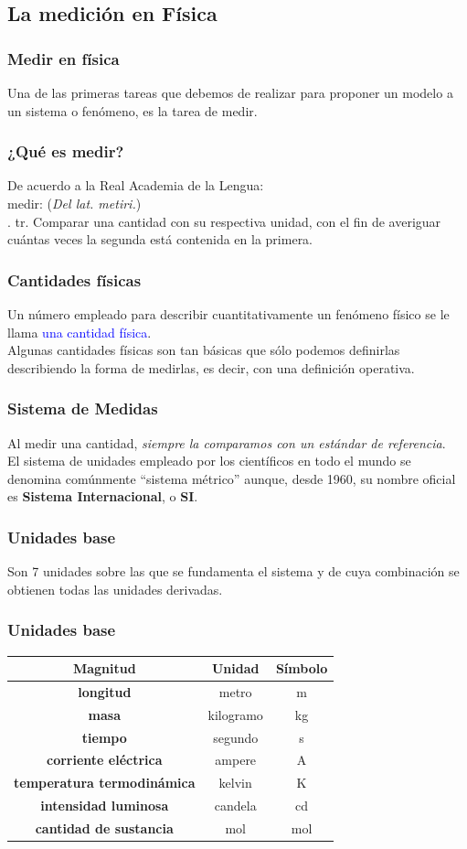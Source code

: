 \subsection{La medición en Física}
\begin{frame}
\frametitle{Medir en física}
Una de las primeras tareas que debemos de realizar para proponer un modelo a un sistema o fenómeno, es la tarea de medir.
\end{frame}
\begin{frame}
\frametitle{¿Qué es medir?}
De acuerdo a la Real Academia de la Lengua:
\\
\bigskip
\pause
medir:
(\textit{Del lat. metiri.})
\\
. tr. Comparar una cantidad con su respectiva unidad, con el fin de averiguar cuántas veces la segunda está contenida en la primera.
\end{frame}
\begin{frame}
\frametitle{Cantidades físicas}
Un número empleado para describir cuantitativamente un fenómeno físico se le llama \textcolor{blue}{una cantidad física}.
\\
\bigskip
\pause
Algunas cantidades físicas son tan básicas que sólo podemos definirlas describiendo la forma de medirlas, es decir, con una definición operativa.
\end{frame}
\begin{frame}
\frametitle{Sistema de Medidas}
Al medir una cantidad, \emph{siempre la comparamos con un estándar de referencia}.
\\
\bigskip
\pause
El sistema de unidades empleado por los científicos en todo el mundo se denomina comúnmente \enquote{sistema métrico} aunque, desde 1960, su nombre oficial es \textbf{Sistema Internacional}, o \textbf{SI}.
\end{frame}
\begin{frame}
\frametitle{Unidades base}
Son 7 unidades sobre las que se fundamenta el sistema y de cuya combinación se obtienen todas las unidades derivadas.
\end{frame}
\begin{frame}[plain]
\frametitle{Unidades base}
\begin{tabular}{ | c | c | c |}
\hline
Magnitud & Unidad & Símbolo \\ \hline
\textbf{longitud} & metro & m \\ \hline
\textbf{masa} & kilogramo & kg \\ \hline
\textbf{tiempo} & segundo & s \\ \hline
\textbf{corriente eléctrica} & ampere & A \\ \hline
\textbf{temperatura termodinámica} & kelvin & K \\ \hline
\textbf{intensidad luminosa} & candela & cd \\ \hline
\textbf{cantidad de sustancia} & mol & mol \\ \hline
\end{tabular}
\end{frame}
